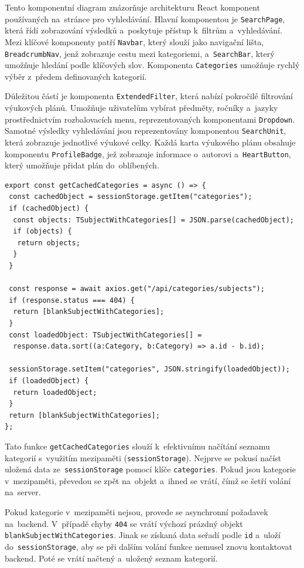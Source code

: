 \documentclass[male,czech,api_bc]{kitheses}
\begin{document}
Tento komponentní diagram znázorňuje architekturu React komponent používaných na~stránce pro vyhledávání. Hlavní komponentou je \texttt{SearchPage}, která řídí zobrazování výsledků a~poskytuje přístup k~filtrům a~vyhledávání. Mezi klíčové komponenty patří \texttt{Navbar}, který slouží jako navigační lišta, \texttt{BreadcrumbNav}, jenž zobrazuje cestu mezi kategoriemi, a~\texttt{SearchBar}, který umožňuje hledání podle klíčových slov. Komponenta \texttt{Categories} umožňuje rychlý výběr z~předem definovaných kategorií.

Důležitou částí je komponenta \texttt{ExtendedFilter}, která nabízí pokročilé filtrování výukových plánů. Umožňuje uživatelům vybírat předměty, ročníky a~jazyky prostřednictvím rozbalovacích menu, reprezentovaných komponentami \texttt{Dropdown}. Samotné výsledky vyhledávání jsou reprezentovány komponentou \texttt{SearchUnit}, která zobrazuje jednotlivé výukové celky. Každá karta výukového plánu obsahuje komponentu \texttt{ProfileBadge}, jež zobrazuje informace o~autorovi a~\texttt{HeartButton}, který umožňuje přidat plán do~oblíbených.

\begin{lstlisting}
export const getCachedCategories = async () => {
 const cachedObject = sessionStorage.getItem("categories");
 if (cachedObject) {
  const objects: TSubjectWithCategories[] = JSON.parse(cachedObject);
  if (objects) {
   return objects;
  }
 }

 const response = await axios.get("/api/categories/subjects");
 if (response.status === 404) {
  return [blankSubjectWithCategories];
 }
 const loadedObject: TSubjectWithCategories[] =
  response.data.sort((a:Category, b:Category) => a.id - b.id);

 sessionStorage.setItem("categories", JSON.stringify(loadedObject));
 if (loadedObject) {
  return loadedObject;
 }
 return [blankSubjectWithCategories];
};
\end{lstlisting}

Tato funkce \texttt{getCachedCategories} slouží k~efektivnímu načítání seznamu kategorií s~využitím mezipaměti (\texttt{sessionStorage}). Nejprve se pokusí načíst uložená data ze~\texttt{sessionStorage} pomocí klíče \texttt{categories}. Pokud jsou kategorie v~mezipaměti, převedou se zpět na~objekt a~ihned se vrátí, čímž se šetří volání na~server.

Pokud kategorie v~mezipaměti nejsou, provede se asynchronní požadavek na~backend. V~případě chyby \texttt{404} se vrátí výchozí prázdný objekt \texttt{blankSubjectWithCategories}. Jinak se získaná data seřadí podle \texttt{id} a~uloží do~\texttt{sessionStorage}, aby se při dalším volání funkce nemusel znovu kontaktovat backend. Poté se vrátí načtený a~uložený seznam kategorií.
\end{document}
